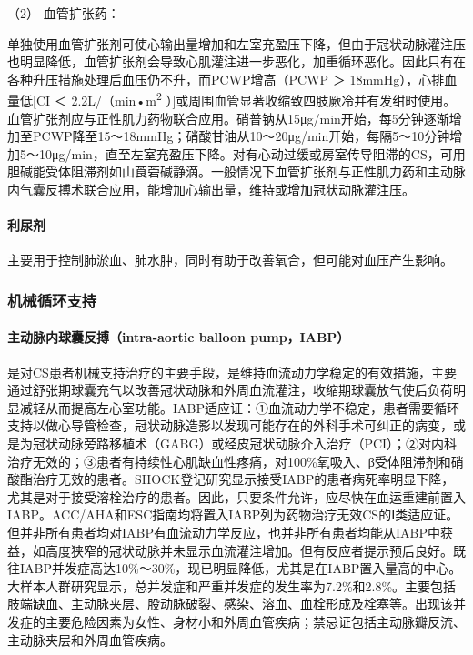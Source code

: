\hypertarget{text00059.htmlux5cux23CHP2-3-3-2-2-2}{}
（2） 血管扩张药：

单独使用血管扩张剂可使心输出量增加和左室充盈压下降，但由于冠状动脉灌注压也明显降低，血管扩张剂会导致心肌灌注进一步恶化，加重循环恶化。因此只有在各种升压措施处理后血压仍不升，而PCWP增高（PCWP
＞ 18mmHg），心排血量低{[}CI ＜ 2.2L/（min•m\textsuperscript{2}
）{]}或周围血管显著收缩致四肢厥冷并有发绀时使用。血管扩张剂应与正性肌力药物联合应用。硝普钠从15μg/min开始，每5分钟逐渐增加至PCWP降至15～18mmHg；硝酸甘油从10～20μg/min开始，每隔5～10分钟增加5～10μg/min，直至左室充盈压下降。对有心动过缓或房室传导阻滞的CS，可用胆碱能受体阻滞剂如山莨菪碱静滴。一般情况下血管扩张剂与正性肌力药和主动脉内气囊反搏术联合应用，能增加心输出量，维持或增加冠状动脉灌注压。

\paragraph{利尿剂}

主要用于控制肺淤血、肺水肿，同时有助于改善氧合，但可能对血压产生影响。

\subsubsection{机械循环支持}

\paragraph{主动脉内球囊反搏（intra-aortic balloon pump，IABP）}

是对CS患者机械支持治疗的主要手段，是维持血流动力学稳定的有效措施，主要通过舒张期球囊充气以改善冠状动脉和外周血流灌注，收缩期球囊放气使后负荷明显减轻从而提高左心室功能。IABP适应证：①血流动力学不稳定，患者需要循环支持以做心导管检查，冠状动脉造影以发现可能存在的外科手术可纠正的病变，或是为冠状动脉旁路移植术（GABG）或经皮冠状动脉介入治疗（PCI）；②对内科治疗无效的；③患者有持续性心肌缺血性疼痛，对100\%氧吸入、β受体阻滞剂和硝酸酯治疗无效的患者。SHOCK登记研究显示接受IABP的患者病死率明显下降，尤其是对于接受溶栓治疗的患者。因此，只要条件允许，应尽快在血运重建前置入IABP。ACC/AHA和ESC指南均将置入IABP列为药物治疗无效CS的Ⅰ类适应证。但并非所有患者均对IABP有血流动力学反应，也并非所有患者均能从IABP中获益，如高度狭窄的冠状动脉并未显示血流灌注增加。但有反应者提示预后良好。既往IABP并发症高达10\%～30\%，现已明显降低，尤其是在IABP置入量高的中心。大样本人群研究显示，总并发症和严重并发症的发生率为7.2\%和2.8\%。主要包括肢端缺血、主动脉夹层、股动脉破裂、感染、溶血、血栓形成及栓塞等。出现该并发症的主要危险因素为女性、身材小和外周血管疾病；禁忌证包括主动脉瓣反流、主动脉夹层和外周血管疾病。

